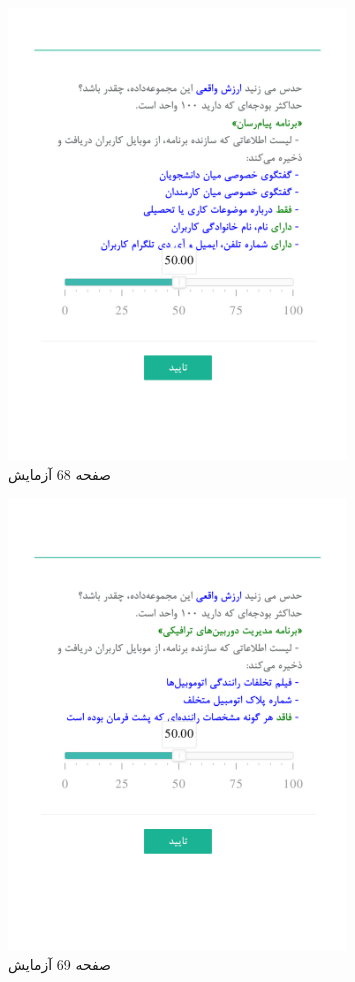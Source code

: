 \begin{figure}[htpb]
    \centering
    \includegraphics[width=0.8\textwidth]{./img/Task68.png}
    \caption{ صفحه 68 آزمایش }
    \label{fig:Task68}
\end{figure}


\begin{figure}[htpb]
    \centering
    \includegraphics[width=0.8\textwidth]{./img/Task69.png}
    \caption{ صفحه 69 آزمایش }
    \label{fig:Task69}
\end{figure}


